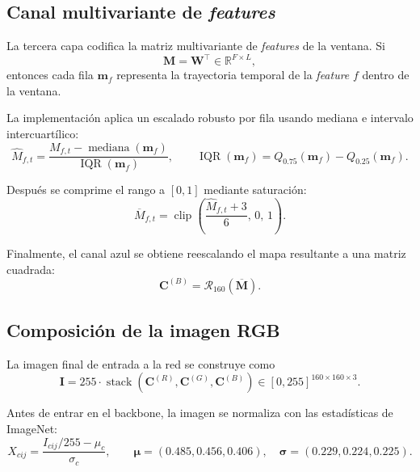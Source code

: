 \documentclass[11pt,a4paper]{article}
\begin{document}
\subsection{Canal multivariante de \emph{features}}

La tercera capa codifica la matriz multivariante de \emph{features} de la ventana. Si
\begin{equation}
\mathbf{M} = \mathbf{W}^{\top} \in \mathbb{R}^{F \times L},
\end{equation}
entonces cada fila $\mathbf{m}_f$ representa la trayectoria temporal de la \emph{feature} $f$ dentro de la ventana.

La implementación aplica un escalado robusto por fila usando mediana e intervalo intercuartílico:
\begin{equation}
\widehat M_{f,t} = \frac{M_{f,t} - \operatorname{mediana}(\mathbf{m}_f)}{\operatorname{IQR}(\mathbf{m}_f)},
\qquad \operatorname{IQR}(\mathbf{m}_f)=Q_{0.75}(\mathbf{m}_f)-Q_{0.25}(\mathbf{m}_f).
\end{equation}

Después se comprime el rango a $[0,1]$ mediante saturación:
\begin{equation}
\overline M_{f,t} = \operatorname{clip}\!\left(\frac{\widehat M_{f,t}+3}{6},\,0,\,1\right).
\end{equation}

Finalmente, el canal azul se obtiene reescalando el mapa resultante a una matriz cuadrada:
\begin{equation}
\mathbf{C}^{(B)} = \mathcal{R}_{160}\!\left(\overline{\mathbf{M}}\right).
\end{equation}

\subsection{Composición de la imagen RGB}

La imagen final de entrada a la red se construye como
\begin{equation}
\mathbf{I} = 255\cdot \operatorname{stack}\left(\mathbf{C}^{(R)},\mathbf{C}^{(G)},\mathbf{C}^{(B)}\right)
\in [0,255]^{160\times 160\times 3}.
\end{equation}

Antes de entrar en el backbone, la imagen se normaliza con las estadísticas de ImageNet:
\begin{equation}
X_{cij} = \frac{I_{cij}/255 - \mu_c}{\sigma_c},
\qquad
\boldsymbol{\mu}=(0.485,0.456,0.406),
\quad
\boldsymbol{\sigma}=(0.229,0.224,0.225).
\end{equation}
\end{document}
